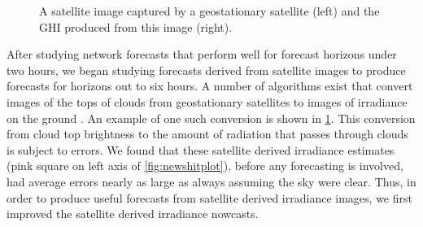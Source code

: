 \begin{figure}[htbp]
\caption[Satellite image and irradiance estimate]{A satellite image
  captured by a geostationary satellite (left) and the GHI produced
  from this image (right).}
\label{fig:satimage_example}
\end{figure}

After studying network forecasts that perform well for forecast
horizons under two hours, we began studying forecasts derived from
satellite images to produce forecasts for horizons out to six hours.
A number of algorithms exist that convert images of the tops of clouds
from geostationary satellites to images of irradiance on the ground
\citep{Kim2016,Perez2002,Rigollier2004,Gautier1980}.
An example of one such conversion is shown in
\cref{fig:satimage_example}.
This conversion from cloud top brightness to the amount of radiation
that passes through clouds is subject to errors.
We found that these satellite derived irradiance estimates (pink
square on left axis of \cref{fig:newshitplot}), before any forecasting
is involved, had average errors nearly as large as always assuming the
sky were clear.
Thus, in order to produce useful forecasts from satellite derived
irradiance images, we first improved the satellite derived irradiance
nowcasts.

